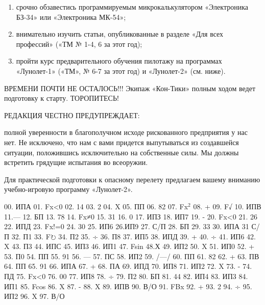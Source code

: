 \documentclass[11pt,a4paper,oneside]{article}
\def\FO{F$\circlearrowright$}
\begin{document}
\begin{enumerate}
\item	срочно обзавестись программируемым микрокалькулятором «Электроника БЗ-34» или «Электроника МК-54»;
\item	внимательно изучить статьи, опубликованные в разделе «Для всех профессий» («ТМ № 1-4, 6 за этот год);
\item	пройти курс предварительного обучения пилотажу на программах «Лунолет-1» («ТМ», № 6-7 за этот год) и «Лунолет-2» (см. ниже).
\end{enumerate}

ВРЕМЕНИ ПОЧТИ НЕ ОСТАЛОСЬ!!! Экипаж «Кон-Тики» полным ходом ведет подготовку к старту. ТОРОПИТЕСЬ!

РЕДАКЦИЯ ЧЕСТНО ПРЕДУПРЕЖДАЕТ:

полной уверенности в благополучном исходе рискованного предприятия у нас нет. Не исключено, что нам с вами придется выпутываться из создавшейся ситуации, положившись исключительно на собственные силы. Мы должны встретить грядущие испытания во всеоружии.

Для практической подготовки к опасному перелету предлагаем вашему вниманию учебно-игровую программу «Лунолет-2».

00. ИПА 01. Fx<0 02. 14 03. 2 04. X 05. ПП 06. 82 07. Fx$^{2}$ 08. + 09. F√ 10. ИПВ 11.— 12. БП 13. 78 14. Fx≠0 15. 31 16. 0 17. ИПЗ 18. ИП7 19. -
20. 	Fx<0 21. 26 22. ИПД 23. Fx!=0 24. 30 25. ИП6 26.ИП9 27. С/П 28. БП 29. 33 30. ИПА 31 С/П 32. П1 33. \FO
34. 	П2 35. ÷ 36. П8 37. ИП5 38. ИПД 39. + 40. ÷ 41. ИП6 42. X 43. П3 44. ИПС 45. ИП3 46. ИП1 47. Fsin 48.Х 49. ИП2 50. X 51. ИП0 52. + 53. П0 54. ПП 55. 91 56. — 57. ПС 58. ИП2 59. /—/ 60. ПП 61. 82 62. + 63. ПВ 64. ПП 65. 91 66. ИПА 67. + 68. ПА 69. ИПД 70. ИП8 71. ИП2 72. X 73. -
74. 	ПД 75. Fx<0 76. 00 77. ИП8 78. ÷ 79. П2 80. БП 81. 44 82. ИП4 83. ИП3 84. ИП1 85. Fcos 86. X 87. - 88. X 89. ИПВ 90. В/О 91. FBx 92. + 93. 2
94. 	÷ 95. ИП2 96. X 97. В/О
\end{document}
